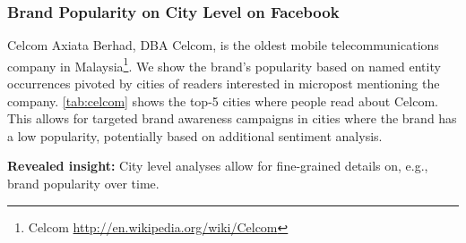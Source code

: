 \documentclass{iosart2c}
\begin{document}
\begin{table}
  \centering
  \qquad
    \caption{Sub continent geolocations of reader interest of some of the Arab Spring key countries (May~1 -- November~12).}
  \label{tab:arabspring}
\end{table}

\subsubsection{Brand Popularity on City Level on Facebook}
Celcom Axiata Berhad, DBA Celcom, is the oldest mobile telecommunications company in Malaysia\footnote{Celcom \url{http://en.wikipedia.org/wiki/Celcom}}.
We show the brand's popularity based on named entity occurrences pivoted by cities of readers interested in micropost mentioning the company.
\autoref{tab:celcom} shows the top-5 cities where people read about Celcom.
This allows for targeted brand awareness campaigns in cities where the brand has a low popularity, potentially based on additional sentiment analysis.

\textbf{Revealed insight:}
City level analyses allow for fine-grained details on, e.g., brand popularity over time.
\end{document}
